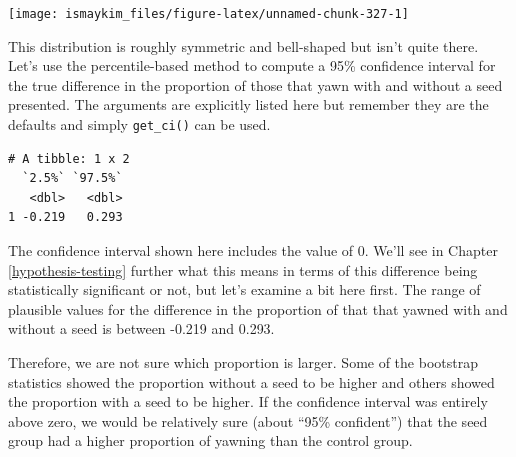 \documentclass[12pt, krantz2,]{krantz}
\makeatletter
\newenvironment{Shaded}{\begin{snugshade}}{\end{snugshade}}
\newcommand{\DataTypeTok}[1]{\textcolor[rgb]{0.27,0.27,0.27}{#1}}
\newcommand{\DecValTok}[1]{\textcolor[rgb]{0.06,0.06,0.06}{#1}}
\newcommand{\FloatTok}[1]{\textcolor[rgb]{0.06,0.06,0.06}{#1}}
\newcommand{\KeywordTok}[1]{\textcolor[rgb]{0.27,0.27,0.27}{\textbf{#1}}}
\newcommand{\NormalTok}[1]{#1}
\newcommand{\OperatorTok}[1]{\textcolor[rgb]{0.43,0.43,0.43}{\textbf{#1}}}
\newcommand{\StringTok}[1]{\textcolor[rgb]{0.5,0.5,0.5}{#1}}
\newenvironment{kframe}{%
\medskip{}
\setlength{\fboxsep}{.8em}
 \def\at@end@of@kframe{}%
 \ifinner\ifhmode%
  \def\at@end@of@kframe{\end{minipage}}%
  \begin{minipage}{\columnwidth}%
 \fi\fi%
 \def\FrameCommand##1{\hskip\@totalleftmargin \hskip-\fboxsep
 \colorbox{shadecolor}{##1}\hskip-\fboxsep
     \hskip-\linewidth \hskip-\@totalleftmargin \hskip\columnwidth}%
 \MakeFramed {\advance\hsize-\width
   \@totalleftmargin\z@ \linewidth\hsize
   \@setminipage}}%
 {\par\unskip\endMakeFramed%
 \at@end@of@kframe}
\renewenvironment{Shaded}{\begin{kframe}}{\end{kframe}}
\makeatother
\begin{document}
\begin{Shaded}
\end{Shaded}

\begin{center}\texttt{[image: ismaykim\_files/figure-latex/unnamed-chunk-327-1]} \end{center}

This distribution is roughly symmetric and bell-shaped but isn't quite there. Let's use the percentile-based method to compute a 95\% confidence interval for the true difference in the proportion of those that yawn with and without a seed presented. The arguments are explicitly listed here but remember they are the defaults and simply \texttt{get\_ci()} can be used.

\begin{Shaded}
\end{Shaded}

\begin{verbatim}
# A tibble: 1 x 2
  `2.5%` `97.5%`
   <dbl>   <dbl>
1 -0.219   0.293
\end{verbatim}

The confidence interval shown here includes the value of 0. We'll see in Chapter \ref{hypothesis-testing} further what this means in terms of this difference being statistically significant or not, but let's examine a bit here first. The range of plausible values for the difference in the proportion of that that yawned with and without a seed is between -0.219 and 0.293.

Therefore, we are not sure which proportion is larger. Some of the bootstrap statistics showed the proportion without a seed to be higher and others showed the proportion with a seed to be higher. If the confidence interval was entirely above zero, we would be relatively sure (about ``95\% confident'') that the seed group had a higher proportion of yawning than the control group.
\end{document}
